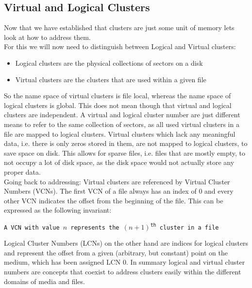 \subsection{Virtual and Logical Clusters}
\label{sec:Cluster:CN}
Now that we have established that clusters are just some unit of memory lets look at how to address them. \\
For this we will now need to distinguish between Logical and Virtual clusters:
\begin{itemize}
	\item Logical clusters are the physical collections of sectors on a disk 
	\item Virtual clusters are the clusters that are used within a given file
\end{itemize}
So the name space of virtual clusters is file local, whereas the name space of logical clusters is global. This does not mean though that virtual and logical clusters are independent. A virtual and logical cluster number are just different means to refer to the same collection of sectors, as all used virtual clusters in a file are mapped to logical clusters. Virtual clusters which lack any meaningful data, i.e. there is only zeros stored in them,  are not mapped to logical clusters, to save space on disk.
This allows for sparse files, i.e. files that are mostly empty, to not occupy a lot of disk space, as the disk space would not actually store any proper data.\\
Going back to addressing: Virtual clusters are referenced by Virtual Cluster Numbers (VCNs). The first VCN of a file always has an index of $0$ and every other VCN indicates the offset from the beginning of the file. This can be expressed as the following invariant:
\begin{center}
\texttt{A VCN with value $n$ represents the $(n+1)$\textsuperscript{th} cluster in a file}\\
\end{center}
Logical Cluster Numbers (LCNs) on the other hand are indices for logical clusters and represent the offset from a given (arbitrary, but constant) point on the medium, which has been assigned LCN $0$.\cite{RUSSINOVICH_ET_AL:2012:WI}
In summary logical and virtual cluster numbers are concepts that coexist to address clusters easily within the different domains of media and files.